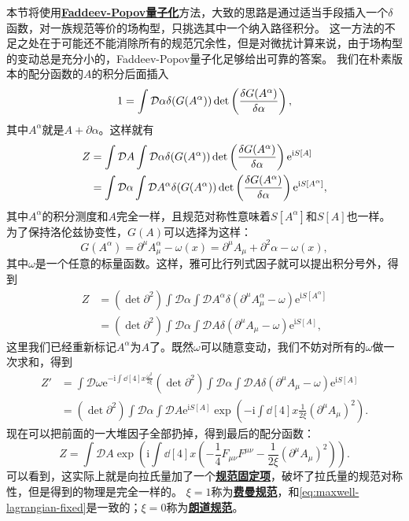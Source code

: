 \documentclass[hyperref, UTF8, a4paper]{ctexart}
\newcommand*{\ii}{\mathrm{i}}
\newcommand*{\ee}{\mathrm{e}}
\newcommand*{\fd}[1]{\mathcal{D} #1}
\newcommand{\concept}[1]{\underline{\textbf{#1}}}
\begin{document}
本节将使用\concept{Faddeev-Popov量子化}方法，大致的思路是通过适当手段插入一个$\delta$函数，对一族规范等价的场构型，只挑选其中一个纳入路径积分。
这一方法的不足之处在于可能还不能消除所有的规范冗余性，但是对微扰计算来说，由于场构型的变动总是充分小的，Faddeev-Popov量子化足够给出可靠的答案。
我们在朴素版本的配分函数的$A$的积分后面插入
\[
    1 = \int \fd{\alpha} \delta(G(A^\alpha)) \det\left( \fdv{G(A^\alpha)}{\alpha} \right),
\]
其中$A^\alpha$就是$A+\partial \alpha$。这样就有
\[
    \begin{aligned}
        Z &= \int \fd{A} \int \fd{\alpha} \delta(G(A^\alpha)) \det\left( \fdv{G(A^\alpha)}{\alpha} \right) \ee^{\ii S[A]} \\
        &= \int \fd{\alpha} \int \fd{A^\alpha} \delta(G(A^\alpha)) \det\left( \fdv{G(A^\alpha)}{\alpha} \right) \ee^{\ii S[A^\alpha]},
    \end{aligned}
\]
其中$A^\alpha$的积分测度和$A$完全一样，且规范对称性意味着$S[A^\alpha]$和$S[A]$也一样。
为了保持洛伦兹协变性，$G(A)$可以选择为这样：
\begin{equation}
    G(A^\alpha) = \partial^\mu A_\mu^\alpha - \omega(x) = \partial^\mu A_\mu + \partial^2 \alpha - \omega(x),
\end{equation}
其中$\omega$是一个任意的标量函数。这样，雅可比行列式因子就可以提出积分号外，得到
\[
    \begin{aligned}
        Z &= (\det \partial^2) \int \fd{\alpha} \int \fd{A^\alpha} \delta(\partial^\mu A_\mu^\alpha - \omega) \ee^{\ii S[A^\alpha]} \\
        &= (\det \partial^2) \int \fd{\alpha} \int \fd{A} \delta(\partial^\mu A_\mu - \omega)  \ee^{\ii S[A]},
    \end{aligned}
\]
这里我们已经重新标记$A^\alpha$为$A$了。既然$\omega$可以随意变动，我们不妨对所有的$\omega$做一次求和，得到
\[
    \begin{aligned}
        Z' &= \int \fd{\omega} \ee^{-\ii \int \dd[4]{x} \frac{\omega^2}{2 \xi}} (\det \partial^2) \int \fd{\alpha} \int \fd{A} \delta(\partial^\mu A_\mu - \omega)  \ee^{\ii S[A]} \\
        &= (\det \partial^2) \int \fd{\alpha} \int \fd{A} \ee^{\ii S[A]} \exp(- \ii \int \dd[4]{x} \frac{1}{2 \xi} (\partial^\mu A_\mu)^2).
    \end{aligned}
\]
现在可以把前面的一大堆因子全部扔掉，得到最后的配分函数：
\begin{equation}
    Z = \int \fd{A} \exp(\ii \int \dd[4]{x} \left( - \frac{1}{4} F_{\mu \nu} F^{\mu \nu} - \frac{1}{2 \xi} (\partial^\mu A_\mu)^2\right)).
\end{equation}
可以看到，这实际上就是向拉氏量加了一个\concept{规范固定项}，破坏了拉氏量的规范对称性，但是得到的物理是完全一样的。
$\xi=1$称为\concept{费曼规范}，和\eqref{eq:maxwell-lagrangian-fixed}是一致的；$\xi=0$称为\concept{朗道规范}。
\end{document}
